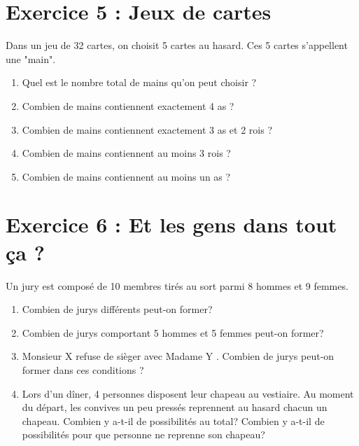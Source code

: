 \section*{Exercice 5 : Jeux de cartes}
Dans un jeu de 32 cartes, on choisit 5 cartes au hasard. Ces 5 cartes s'appellent une "main".

\begin{enumerate}
    \item Quel est le nombre total de mains qu'on peut choisir ?
    \item Combien de mains contiennent exactement 4 as ?
    \item Combien de mains contiennent exactement 3 as et 2 rois ?
    \item Combien de mains contiennent au moins 3 rois ?
    \item Combien de mains contiennent au moins un as ?
\end{enumerate}
 
\section*{Exercice 6 : Et les gens dans tout ça ?}

Un jury est composé de 10 membres tirés au sort parmi 8 hommes et 9 femmes.

\begin{enumerate}
\item Combien de jurys différents peut-on former?
\item Combien de jurys comportant 5 hommes et 5 femmes peut-on former?
\item Monsieur X refuse de sièger avec Madame Y . Combien de jurys peut-on former dans ces conditions ?
\item Lors d'un dîner, 4 personnes disposent leur chapeau au vestiaire. Au moment du départ, les convives un peu pressés reprennent au hasard chacun un chapeau. Combien y a-t-il de possibilités au total? Combien y a-t-il de possibilités pour que personne ne reprenne son chapeau?
\end{enumerate}
